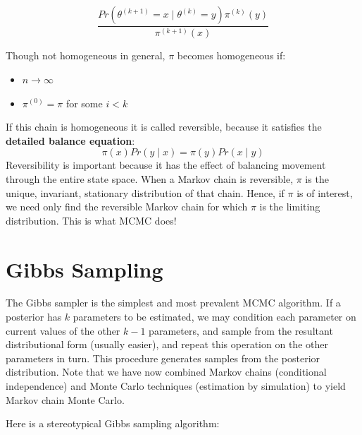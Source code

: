 \[
\frac{Pr(\theta^{(k+1)}=x \mid \theta^{(k)}=y) \pi^{(k)}(y)}{\pi^{(k+1)}(x)}
\]

\noindent Though not homogeneous in general, $\pi$ becomes homogeneous if:
\begin{itemize}
\item $n \rightarrow \infty$
\item $\pi^{(0)}=\pi$ for some $i < k$
\end{itemize}

\noindent If this chain is homogeneous it is called reversible, because it satisfies the \textbf{detailed balance equation}:
\[
\pi(x)Pr(y \mid x) = \pi(y) Pr(x \mid y)
\]
Reversibility is important because it has the effect of balancing movement through the entire state space. When a Markov chain is reversible, $\pi$ is the unique, invariant, stationary distribution of that chain.
Hence, if $\pi$ is of interest, we need only find the reversible Markov chain for which $\pi$ is the limiting distribution. This is what MCMC does!


\hypertarget{gibbs-sampling}{}
\section*{Gibbs Sampling}

The Gibbs sampler is the simplest and most prevalent MCMC algorithm. If a posterior has $k$ parameters to be estimated, we may condition each parameter on current values of the other $k-1$ parameters, and sample from the resultant distributional form (usually easier), and repeat this operation on the other parameters in turn. This procedure generates samples from the posterior distribution. Note that we have now combined Markov chains (conditional independence) and Monte Carlo techniques (estimation by simulation) to yield Markov chain Monte Carlo.

Here is a stereotypical Gibbs sampling algorithm:


